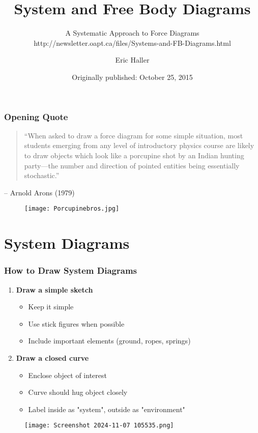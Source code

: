 \documentclass{beamer}
\title[System \& Free Body Diagrams]{System and Free Body Diagrams}
\subtitle{A Systematic Approach to Force Diagrams\\http://newsletter.oapt.ca/files/Systems-and-FB-Diagrams.html}
\author[E. Haller]{Eric Haller}
\date[2015]{Originally published: October 25, 2015}
\begin{document}
\frame{\titlepage}

\begin{frame}
\frametitle{Opening Quote}
\begin{quote}
``When asked to draw a force diagram for some simple situation, most students emerging from any level of introductory physics course are likely to draw objects which look like a porcupine shot by an Indian hunting party—the number and direction of pointed entities being essentially stochastic.''
\end{quote}
\vspace{0.5cm}
\hfill -- Arnold Arons (1979)
\begin{figure}[H]
    \centering
    \texttt{[image: Porcupinebros.jpg]}
\end{figure}
\end{frame}

\section{System Diagrams}

\begin{frame}
\frametitle{How to Draw System Diagrams}
\begin{enumerate}
    \item \textbf{Draw a simple sketch}
    \begin{itemize}
        \item Keep it simple
        \item Use stick figures when possible
        \item Include important elements (ground, ropes, springs)
    \end{itemize}
    \item \textbf{Draw a closed curve}
    \begin{itemize}
        \item Enclose object of interest
        \item Curve should hug object closely
        \item Label inside as "system", outside as "environment"
    \end{itemize}
\end{enumerate}
\begin{figure}
    \centering
    \texttt{[image: Screenshot 2024-11-07 105535.png]}
\end{figure}

\end{frame}
\end{document}
